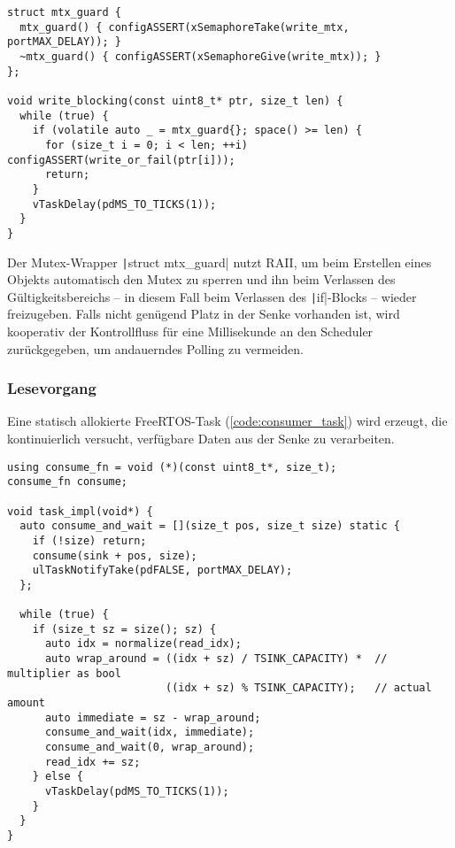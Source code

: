 \begin{code}
\begin{verbatim}
struct mtx_guard {
  mtx_guard() { configASSERT(xSemaphoreTake(write_mtx, portMAX_DELAY)); }
  ~mtx_guard() { configASSERT(xSemaphoreGive(write_mtx)); }
};

void write_blocking(const uint8_t* ptr, size_t len) {
  while (true) {
    if (volatile auto _ = mtx_guard{}; space() >= len) {
      for (size_t i = 0; i < len; ++i) configASSERT(write_or_fail(ptr[i]));
      return;
    }
    vTaskDelay(pdMS_TO_TICKS(1));
  }
}
\end{verbatim}
    \label{code:write_op}
\end{code}

Der Mutex-Wrapper \texttt|struct mtx_guard| nutzt \ac{RAII}, um beim
Erstellen eines Objekts automatisch den Mutex zu sperren und ihn beim Verlassen
des Gültigkeitsbereichs -- in diesem Fall beim Verlassen des
\texttt|if|-Blocks -- wieder freizugeben. Falls nicht genügend Platz in
der Senke vorhanden ist, wird kooperativ der Kontrollfluss für eine Millisekunde
an den Scheduler zurückgegeben, um andauerndes Polling zu vermeiden.

\subsubsection{Lesevorgang}

Eine statisch allokierte FreeRTOS-Task (\ref{code:consumer_task}) wird erzeugt,
die kontinuierlich versucht, verfügbare Daten aus der Senke zu verarbeiten.

\begin{code}
\begin{verbatim}
using consume_fn = void (*)(const uint8_t*, size_t);
consume_fn consume;

void task_impl(void*) {
  auto consume_and_wait = [](size_t pos, size_t size) static {
    if (!size) return;
    consume(sink + pos, size);
    ulTaskNotifyTake(pdFALSE, portMAX_DELAY);
  };

  while (true) {
    if (size_t sz = size(); sz) {
      auto idx = normalize(read_idx);
      auto wrap_around = ((idx + sz) / TSINK_CAPACITY) *  // multiplier as bool
                         ((idx + sz) % TSINK_CAPACITY);   // actual amount
      auto immediate = sz - wrap_around;
      consume_and_wait(idx, immediate);
      consume_and_wait(0, wrap_around);
      read_idx += sz;
    } else {
      vTaskDelay(pdMS_TO_TICKS(1));
    }
  }
}
\end{verbatim}
    \label{code:consumer_task}
\end{code}

